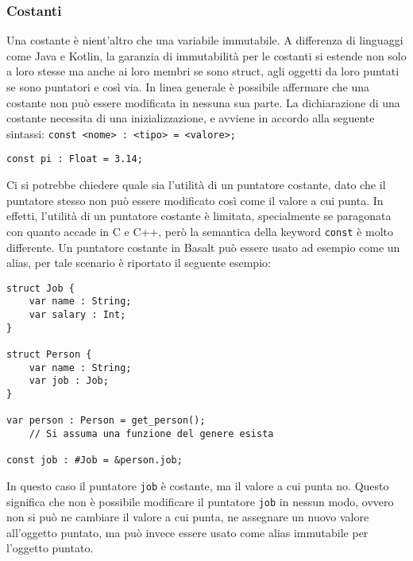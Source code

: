 \subsubsection{Costanti}
Una costante è nient'altro che una variabile immutabile. A differenza di linguaggi come Java e Kotlin, la garanzia di immutabilità per le costanti
si estende non solo a loro stesse ma anche ai loro membri se sono struct, agli oggetti da loro puntati se sono puntatori e così via. In linea generale
è possibile affermare che una costante non può essere modificata in nessuna sua parte. La dichiarazione di una costante necessita di una inizializzazione, 
e avviene in accordo alla seguente sintassi: \texttt{const <nome> : <tipo> = <valore>;}

\vspace{0.5cm}
\begin{lstlisting}[frame=single]
const pi : Float = 3.14;
\end{lstlisting}

Ci si potrebbe chiedere quale sia l'utilità di un puntatore costante, dato che il puntatore stesso non può essere modificato così come il valore a cui punta.
In effetti, l'utilità di un puntatore costante è limitata, specialmente se paragonata con quanto accade in C e C++, però la semantica della keyword \texttt{const}
è molto differente. Un puntatore costante in Basalt può essere usato ad esempio come un alias, per tale scenario è riportato il seguente esempio:

\vspace{0.5cm}
\begin{lstlisting}[frame=single]
struct Job {
    var name : String;
    var salary : Int;
}

struct Person {
    var name : String;
    var job : Job;
}

var person : Person = get_person(); 
    // Si assuma una funzione del genere esista

const job : #Job = &person.job;
\end{lstlisting}
\vspace{0.5cm}

In questo caso il puntatore \texttt{job} è costante, ma il valore a cui punta no. Questo significa che non è possibile modificare il puntatore 
\texttt{job} in nessun modo, ovvero non si può ne cambiare il valore a cui punta, ne assegnare un nuovo valore all'oggetto puntato, ma può invece essere 
usato come alias immutabile per l'oggetto puntato. \\

